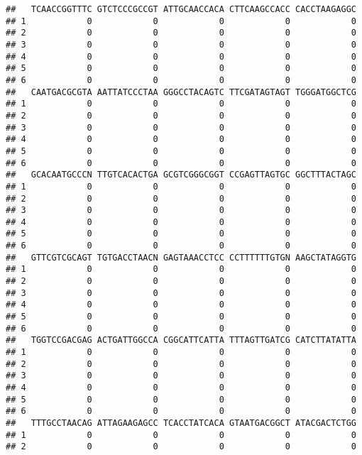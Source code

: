 \documentclass[]{article}
\begin{document}
\begin{verbatim}
##   TCAACCGGTTTC GTCTCCCGCCGT ATTGCAACCACA CTTCAAGCCACC CACCTAAGAGGC
## 1            0            0            0            0            0
## 2            0            0            0            0            0
## 3            0            0            0            0            0
## 4            0            0            0            0            0
## 5            0            0            0            0            0
## 6            0            0            0            0            0
##   CAATGACGCGTA AATTATCCCTAA GGGCCTACAGTC TTCGATAGTAGT TGGGATGGCTCG
## 1            0            0            0            0            0
## 2            0            0            0            0            0
## 3            0            0            0            0            0
## 4            0            0            0            0            0
## 5            0            0            0            0            0
## 6            0            0            0            0            0
##   GCACAATGCCCN TTGTCACACTGA GCGTCGGGCGGT CCGAGTTAGTGC GGCTTTACTAGC
## 1            0            0            0            0            0
## 2            0            0            0            0            0
## 3            0            0            0            0            0
## 4            0            0            0            0            0
## 5            0            0            0            0            0
## 6            0            0            0            0            0
##   GTTCGTCGCAGT TGTGACCTAACN GAGTAAACCTCC CCTTTTTTGTGN AAGCTATAGGTG
## 1            0            0            0            0            0
## 2            0            0            0            0            0
## 3            0            0            0            0            0
## 4            0            0            0            0            0
## 5            0            0            0            0            0
## 6            0            0            0            0            0
##   TGGTCCGACGAG ACTGATTGGCCA CGGCATTCATTA TTTAGTTGATCG CATCTTATATTA
## 1            0            0            0            0            0
## 2            0            0            0            0            0
## 3            0            0            0            0            0
## 4            0            0            0            0            0
## 5            0            0            0            0            0
## 6            0            0            0            0            0
##   TTTGCCTAACAG ATTAGAAGAGCC TCACCTATCACA GTAATGACGGCT ATACGACTCTGG
## 1            0            0            0            0            0
## 2            0            0            0            0            0

\end{verbatim}
\end{document}
